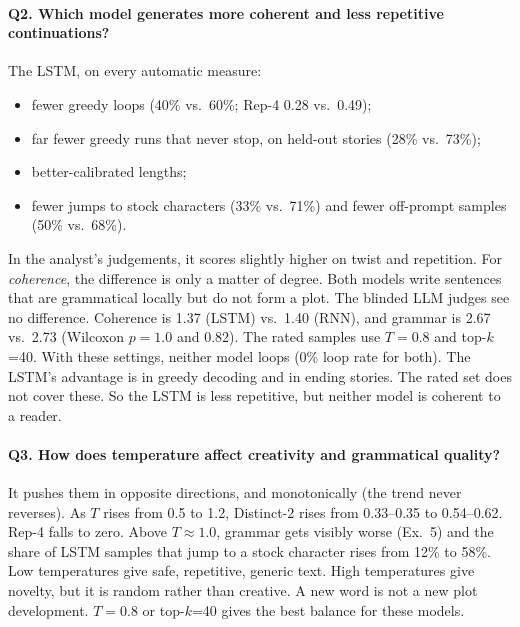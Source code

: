 \documentclass[11pt,a4paper]{article}
\begin{document}
\paragraph{Q2. Which model generates more coherent and less repetitive continuations?} The LSTM,
on every automatic measure:
\begin{itemize}
\item fewer greedy loops (40\% vs.\ 60\%; Rep-4 0.28 vs.\ 0.49);
\item far fewer greedy runs that never stop, on held-out stories (28\% vs.\ 73\%);
\item better-calibrated lengths;
\item fewer jumps to stock characters (33\% vs.\ 71\%) and fewer off-prompt samples (50\% vs.\ 68\%).
\end{itemize}
In the analyst's judgements, it scores slightly higher on twist and repetition. For
\emph{coherence}, the difference is only a matter of degree. Both models write sentences that are
grammatical locally but do not form a plot. The blinded LLM judges see no difference. Coherence is
1.37 (LSTM) vs.\ 1.40 (RNN), and grammar is 2.67 vs.\ 2.73 (Wilcoxon $p=1.0$ and $0.82$). The
rated samples use $T=0.8$ and top-$k$=40. With these settings, neither model loops (0\% loop rate
for both). The LSTM's advantage is in greedy decoding and in ending stories. The rated set does not
cover these. So the LSTM is less repetitive, but neither model is coherent to a reader.

\paragraph{Q3. How does temperature affect creativity and grammatical quality?} It pushes them in
opposite directions, and monotonically (the trend never reverses). As $T$ rises from 0.5 to 1.2,
Distinct-2 rises from 0.33--0.35 to 0.54--0.62. Rep-4 falls to zero. Above $T\approx1.0$, grammar
gets visibly worse (Ex.~5) and the share of LSTM samples that jump to a stock character rises from
12\% to 58\%. Low temperatures give safe, repetitive, generic text. High temperatures give novelty,
but it is random rather than creative. A new word is not a new plot development. $T=0.8$ or
top-$k$=40 gives the best balance for these models.
\end{document}
